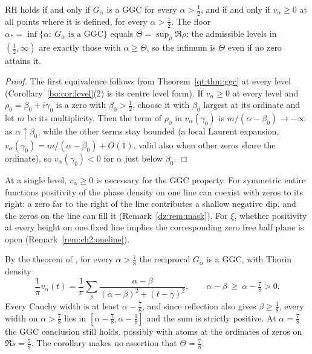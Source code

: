 \begin{corollary}\label{qt:cor:rh}
RH holds if and only if $G_\alpha$ is a GGC for every $\alpha>\frac12$, and if and only if $v_\alpha\ge0$ at all points where it is defined, for every $\alpha>\frac12$. The floor $\alpha_*=\inf\{\alpha:\ G_\alpha\text{ is a GGC}\}$ equals $\Theta=\sup_\rho\Re\rho$: the admissible levels in $(\frac12,\infty)$ are exactly those with $\alpha\ge\Theta$, so the infimum is $\Theta$ even if no zero attains it.
\end{corollary}

\begin{proof}
The first equivalence follows from Theorem~\ref{qt:thm:ggc} at every level (Corollary~\ref{bo:cor:level}(2) is its centre level form). If $v_\alpha\ge0$ at every level and $\rho_0=\beta_0+i\gamma_0$ is a zero with $\beta_0>\frac12$, choose it with $\beta_0$ largest at its ordinate and let $m$ be its multiplicity. Then the term of $\rho_0$ in $v_\alpha(\gamma_0)$ is $m/(\alpha-\beta_0)\to-\infty$ as $\alpha\uparrow\beta_0$, while the other terms stay bounded (a local Laurent expansion, $v_\alpha(\gamma_0)=m/(\alpha-\beta_0)+O(1)$, valid also when other zeros share the ordinate), so $v_\alpha(\gamma_0)<0$ for $\alpha$ just below $\beta_0$.
\end{proof}

\begin{remark}\label{qt:rem:onelevel}
At a single level, $v_\alpha\ge0$ is necessary for the GGC property. For symmetric entire functions positivity of the phase density on one line can coexist with zeros to its right: a zero far to the right of the line contributes a shallow negative dip, and the zeros on the line can fill it (Remark~\ref{dz:rem:mask}). For $\xi$, whether positivity at every height on one fixed line implies the corresponding zero free half plane is open (Remark~\ref{rem:ch2:oneline}).
\end{remark}

\begin{corollary}[the floor $b=\frac78$]\label{qt:cor:floor}
By the theorem of \cite{OAI26a}, for every $\alpha>\frac78$ the reciprocal $G_\alpha$ is a GGC, with Thorin density
\[
\frac1\pi v_\alpha(t)=\frac1\pi\sum_\rho\frac{\alpha-\beta}{(\alpha-\beta)^2+(t-\gamma)^2},\qquad \alpha-\beta\ \ge\ \alpha-\tfrac78>0 .
\]
Every Cauchy width is at least $\alpha-\frac78$, and since reflection also gives $\beta\ge\frac18$, every width on $\alpha>\frac78$ lies in $[\alpha-\frac78,\alpha-\frac18]$ and the sum is strictly positive. At $\alpha=\frac78$ the GGC conclusion still holds, possibly with atoms at the ordinates of zeros on $\Re s=\frac78$. The corollary makes no assertion that $\Theta=\frac78$.
\end{corollary}

